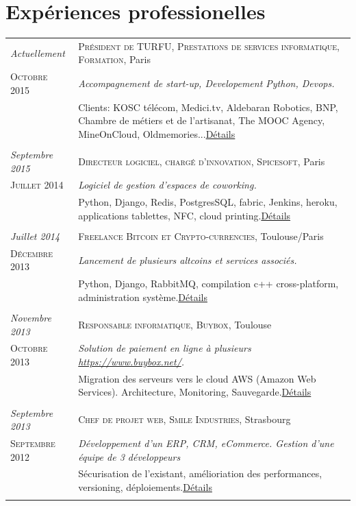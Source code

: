 \documentclass[a4paper,10pt]{article}
\begin{document}
\section{Expériences professionelles}
\begin{tabular}{p{}|p{}}	

	\emph{Actuellement} & \textsc{Président de TURFU, Prestations de services informatique, Formation}, Paris \\\textsc{Octobre 2015}&\emph{Accompagnement de start-up, Developement Python, Devops.}\\&\footnotesize{Clients: KOSC télécom, Medici.tv, Aldebaran Robotics, BNP, Chambre de métiers et de l'artisanat, The MOOC Agency, MineOnCloud, Oldmemories...\hyperlink{turfu}{\hfill \footnotesize Détails}}\\\multicolumn{2}{c}{} \\
	
	\emph{Septembre 2015} & \textsc{Directeur logiciel, chargé d'innovation, Spicesoft}, Paris \\\textsc{Juillet 2014}&\emph{Logiciel de gestion d'espaces de coworking.}\\&\footnotesize{Python, Django, Redis, PostgresSQL, fabric, Jenkins, heroku, applications tablettes, NFC, cloud printing.\hyperlink{spicesoft}{\hfill \footnotesize Détails}}\\\multicolumn{2}{c}{} \\
	
	\emph{Juillet 2014} & \textsc{Freelance Bitcoin et Crypto-currencies}, Toulouse/Paris \\\textsc{Décembre 2013}&\emph{Lancement de plusieurs altcoins et services associés.}\\&\footnotesize{Python, Django, RabbitMQ, compilation c++ cross-platform, administration système.\hyperlink{bitcoin}{\hfill \footnotesize Détails}}\\\multicolumn{2}{c}{} \\

	\emph{Novembre 2013} & \textsc{Responsable informatique, Buybox}, Toulouse \\\textsc{Octobre 2013}&\emph{Solution de paiement en ligne à plusieurs \href{https://www.buybox.net/}{https://www.buybox.net/}.}\\&\footnotesize{Migration des serveurs vers le cloud AWS (Amazon Web Services). Architecture, Monitoring, Sauvegarde.\hyperlink{buybox}{\hfill \footnotesize Détails}}\\\multicolumn{2}{c}{} \\
	\emph{Septembre 2013} & \textsc{Chef de projet web, Smile Industries}, Strasbourg \\\textsc{Septembre 2012}&\emph{Développement d'un ERP, CRM, eCommerce. Gestion d'une équipe de 3 développeurs}\\&\footnotesize{Sécurisation de l'existant, amélioriation des performances, versioning, déploiements.\hyperlink{axess}{\hfill \footnotesize Détails}}\\\multicolumn{2}{c}{} \\


\end{tabular}
\end{document}
